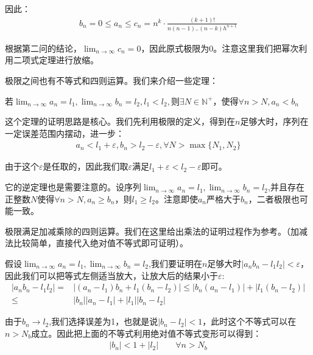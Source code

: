 \documentclass{ctexart}
\begin{document}
因此：
\begin{align*}
    b_n=0\leq a_n\leq c_n=n^k \cdot \frac{(k+1)!}{n(n-1)..(n-k)h^{n+1}}
\end{align*}

根据第二问的结论，$\lim_{n\to\infty} c_n=0$，因此原式极限为0。注意这里我们把幂次利用二项式定理进行放缩。

极限之间也有不等式和四则运算。我们来介绍一些定理：
\begin{tcolorbox}[
    colback=bac2,     %
    colframe=fra2,   %
    coltitle=white,             %
    coltext=tex2,
    title=极限不等式,
    fonttitle=\bfseries,        %
arc=3mm,                     %
breakable
]
若$\lim_{n\to\infty}a_n=l_1,\lim_{n\to\infty}b_n=l_2,l_1<l_2,$则$\exists N\in \mathbb{N^+}$，使得$\forall n>N,a_n<b_n$
\end{tcolorbox}

这个定理的证明思路是核心。我们先利用极限的定义，得到在$n$足够大时，序列在一定误差范围内摆动，进一步：
\begin{align*}
    a_n<l_1+\varepsilon,b_n>l_2-\varepsilon,\forall N>\max\{N_1,N_2\}
\end{align*}

由于这个$\varepsilon$是任取的，因此我们取$\varepsilon$满足$l_1+\varepsilon<l_2-\varepsilon$即可。

它的逆定理也是需要注意的。设序列$\lim_{n\to\infty}a_n=l_1,\lim_{n\to\infty}b_n=l_2$,并且存在正整数$N$使得$\forall n>N,a_n\geq b_n$，则$l_1\geq l_2$。注意即使$a_n$严格大于$b_n$，二者极限也可能一致。

极限满足加减乘除的四则运算。我们在这里给出乘法的证明过程作为参考。（加减法比较简单，直接代入绝对值不等式即可证明）。

假设$\lim_{n\to\infty}a_n=l_1,\lim_{n\to\infty}b_n=l_2$,我们要证明在$n$足够大时$|a_nb_n-l_1l_2|<\varepsilon$，因此我们可以把等式左侧适当放大，让放大后的结果小于$\varepsilon$:
\begin{align*}
    |a_nb_n-l_1l_2|=&|(a_n-l_1)b_n+l_1(b_n-l_2)|\leq |b_n(a_n-l_1)|+|l_1(b_n-l_2)|\\
    \leq&|b_n||a_n-l_1|+|l_1||b_n-l_2|
\end{align*}

由于$b_n\to l_2$,我们选择误差为1，也就是说$|b_n-l_2|<1$，此时这个不等式可以在$n>N_b$成立。因此把上面的不等式利用绝对值不等式变形可以得到：
\begin{align*}
    |b_n|<1+|l_2|\qquad \forall n>N_b
\end{align*}
\end{document}
